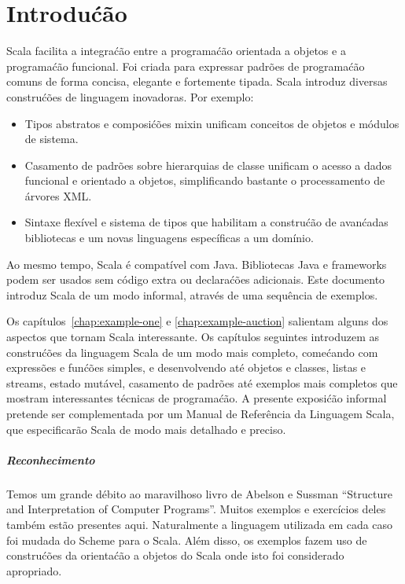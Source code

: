 \documentclass[a4paper,12pt,twoside,titlepage]{book}
\begin{document}
\frontmatter
\makedoctitle
\clearemptydoublepage
\tableofcontents
\mainmatter
\sloppy

\chapter{\label{chap:intro}Introdu\'{c}\~{a}o}

Scala facilita a integra\'{c}\~{a}o entre a  programa\'{c}\~{a}o orientada a objetos e a programa\'{c}\~{a}o funcional.
Foi criada para expressar padr\~{o}es de programa\'{c}\~{a}o comuns de forma concisa, elegante e fortemente tipada. 
Scala introduz diversas constru\'{c}\~{o}es de linguagem inovadoras. Por exemplo:

\begin{itemize}

\item
Tipos abstratos e composi\'{c}\~{o}es mixin unificam conceitos de objetos e m\'{o}dulos de sistema.
\item
Casamento de padr\~{o}es sobre hierarquias de classe unificam o acesso a dados funcional e orientado a 
objetos, simplificando bastante o processamento de \'{a}rvores XML.
\item
Sintaxe flex\'{i}vel e sistema de tipos que habilitam a constru\'{c}\~{a}o de avan\'{c}adas 
bibliotecas e um novas linguagens espec\'{i}ficas a um dom\'{i}nio.
\end{itemize}

Ao mesmo tempo, Scala \'{e} compat\'{i}vel com Java. Bibliotecas Java e frameworks
podem ser usados sem c\'{o}digo extra ou declara\'{c}\~{o}es adicionais.
Este documento introduz Scala de um modo informal, atrav\'{e}s de uma sequ\^{e}ncia
de exemplos.

Os cap\'{i}tulos~\ref{chap:example-one} e \ref{chap:example-auction}
salientam alguns dos aspectos que tornam Scala interessante. Os
cap\'{i}tulos seguintes introduzem as constru\'{c}\~{o}es da linguagem Scala de um
modo mais completo, come\'{c}ando com express\~{o}es e fun\'{c}\~{o}es simples, e 
desenvolvendo at\'{e} objetos e classes, listas e streams, estado 
mut\'{a}vel, casamento de padr\~{o}es at\'{e} exemplos mais completos que mostram
interessantes t\'{e}cnicas de programa\'{c}\~{a}o. A presente exposi\'{c}\~{a}o informal
pretende ser complementada por um Manual de Refer\^{e}ncia da Linguagem Scala, que
especificar\~{a}o Scala de modo mais detalhado e preciso. 

\paragraph{Reconhecimento}

Temos um grande d\'{e}bito ao maravilhoso livro de Abelson e Sussman
``Structure and Interpretation of Computer
Programs''\cite{abelson-sussman:structure}. Muitos exemplos e exerc\'{i}cios 
deles tamb\'{e}m est\~{a}o presentes aqui. Naturalmente a linguagem utilizada em
cada caso foi mudada do Scheme para o Scala. Al\'{e}m disso, os exemplos
fazem uso de constru\'{c}\~{o}es da orienta\'{c}\~{a}o a objetos do Scala onde isto foi
considerado apropriado. 




\end{document}
